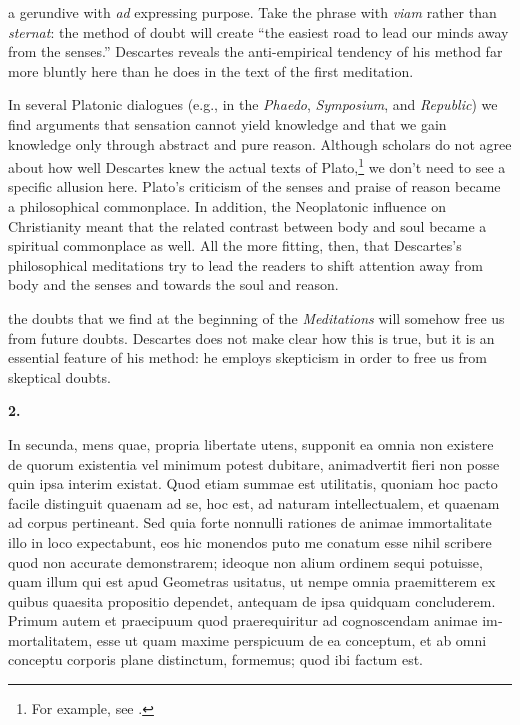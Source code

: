  a gerundive with \textit{ad} expressing purpose. Take the phrase with \textit{viam} rather than \textit{sternat}: the method of doubt will create ``the easiest road to lead our minds away from the senses.'' Descartes reveals the anti-empirical tendency of his method far more bluntly here than he does in the text of the first meditation.

In several Platonic dialogues (e.g., in the \textit{Phaedo}, \textit{Symposium}, and \textit{Republic}) we find arguments that sensation cannot yield knowledge and that we gain knowledge only through abstract and pure reason. Although scholars do not agree about how well Descartes knew the actual texts of Plato,\footnote{For example, see \textcite[556, especially note 11]{grene1999}.} we don't need to see a specific allusion here. Plato's criticism of the senses and praise of reason became a philosophical commonplace. In addition, the Neoplatonic influence on Christianity meant that the related contrast between body and soul became a spiritual commonplace as well. All the more fitting, then, that Descartes's philosophical meditations try to lead the readers to shift attention away from body and the senses and towards the soul and reason.

 the doubts that we find at the beginning of the \textit{Meditations} will somehow free us from future doubts. Descartes does not make clear how this is true, but it is an essential feature of his method: he employs skepticism in order to free us from skeptical doubts.


\clearpage

\beginnumbering
\pstart
\textbf{2.} \begin{latin}In secunda, mens quae, propria libertate utens, supponit ea omnia non existere de quorum existentia vel minimum potest dubitare, animadvertit fieri non posse quin ipsa interim existat. Quod etiam summae est utilitatis, quoniam hoc pacto facile distinguit quaenam ad se, hoc est, ad naturam intellectualem, et quaenam ad corpus pertineant. Sed quia forte nonnulli rationes de animae immortalitate illo in loco expectabunt, eos hic monendos  puto me conatum esse nihil scribere quod non accurate demonstrarem; ideoque non alium ordinem sequi potuisse, quam illum qui est apud Geometras usitatus, ut nempe omnia praemitterem ex quibus quaesita propositio dependet, antequam de ipsa quidquam concluderem. Primum autem et praecipuum quod praerequiritur ad cognoscendam animae immortalitatem, esse ut quam maxime perspicuum de ea conceptum, et ab omni conceptu corporis plane distinctum, formemus; quod ibi factum est.\end{latin}
\pend
\endnumbering

